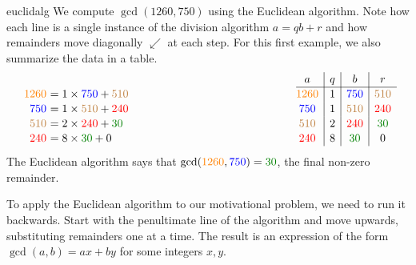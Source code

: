 \begin{example}{}{euclidalg}
	We compute $\gcd(1260,750)$ using the Euclidean algorithm. Note how each line is a single instance of the division algorithm $a=qb+r$ and how remainders move diagonally $\swarrow$ at each step. For this first example, we also summarize the data in a table.\vspace{-10pt}
	\[
		\renewcommand{\arraystretch}{1.1}
		\begin{array}{r@{\,\,}l@{\hspace{150pt}}c|c|c|c}
			& & a & q & b & r \\\cline{3-6}
			\textcolor{orange}{1260} & =1\times\textcolor{blue}{750}+\textcolor{brown}{510} & \textcolor{orange}{1260}& 1 & \textcolor{blue}{750} & \textcolor{brown}{510}\\
			\textcolor{blue}{750} & =1\times\textcolor{brown}{510}+\textcolor{red}{240} & \textcolor{blue}{750}& 1 & \textcolor{brown}{510} & \textcolor{red}{240}\\
			\textcolor{brown}{510} & =2\times\textcolor{red}{240}+\textcolor{Green}{30} & \textcolor{brown}{510} & 2 & \textcolor{red}{240} & \textcolor{Green}{30}\\
			\textcolor{red}{240} & =8\times\textcolor{Green}{30}+0 & \textcolor{red}{240} & 8 & \textcolor{Green}{30} & 0
		\end{array}
	\]
	The Euclidean algorithm says that $\gcd(\textcolor{orange}{1260},\textcolor{blue}{750})=\textcolor{Green}{30}$, the final non-zero remainder.
\end{example}

\goodbreak



To apply the Euclidean algorithm to our motivational problem, we need to run it backwards. Start with the penultimate line of the algorithm and move upwards, substituting remainders one at a time. The result is an expression of the form $\gcd(a,b)=ax+by$ for some integers $x,y$.

